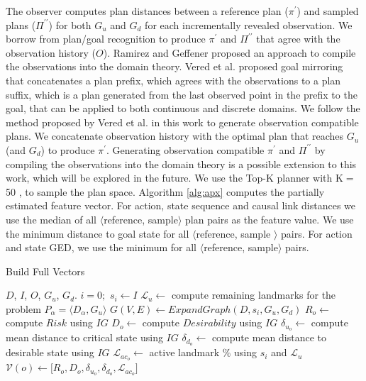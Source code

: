 \documentclass[letterpaper]{article}
\theoremstyle{plain}
\begin{document}
The observer computes plan distances between a reference plan ($\pi^\prime$) and sampled plans ($\Pi^{\prime\prime}$) for both $G_u$ and $G_d$ for each incrementally revealed observation. We borrow from plan/goal recognition to produce $\pi^\prime$ and $\Pi^{\prime\prime}$ that agree with the observation history ($O$). Ramirez and Geffener  proposed an approach to compile the observations into the domain theory. Vered et al.  proposed goal mirroring that concatenates a plan prefix, which agrees with the observations to a plan suffix, which is a plan generated from the last observed point in the prefix to the goal, that can be applied to both continuous and discrete domains. We follow the method proposed by Vered et al.  in this work to generate observation compatible plans. We concatenate observation history with the optimal plan that reaches $G_u$ (and $G_d$) to produce $\pi^\prime$. Generating observation compatible $\pi^\prime$ and $\Pi^{\prime\prime}$ by compiling the observations into the domain theory is a possible extension to this work, which will be explored in the future. We use the Top-K planner with K$=$50 \cite{riabov2014}, to sample the plan space. Algorithm \ref{alg:apx} computes the partially estimated feature vector. For action, state sequence and causal link distances we use the median of all $\langle$reference, sample$\rangle$ plan pairs as the feature value. We use the minimum distance to goal state for all $\langle$reference, sample $\rangle$ pairs. For action and state GED, we use the minimum for all $\langle$reference, sample$\rangle$ pairs.
\vspace{-2mm}
\begin{algorithm}[tb]
        \caption{Build Full Vectors}
        \label{alg:exact}
        \begin{algorithmic}[1]
                \Require $D$, $I$, $O$, $G_u$, $G_d$.
                \State $i=0;$ $ s_i \gets I$
                \State $\mathcal{L}_{u} \gets$ compute remaining landmarks for the problem $P_\alpha=\langle D_\alpha, G_u\rangle$
                        \State $G(V,E) \gets ExpandGraph(D,s_i,G_u,G_d)$
                        \State $R_o \gets$ compute $Risk$ using $IG$
                        \State $D_o \gets$ compute $Desirability$ using $IG$
                        \State $\delta_{u_o} \gets$ compute mean distance to critical state using $IG$
                        \State $\delta_{d_o} \gets$ compute mean distance to desirable state using $IG$
                        \State $\mathcal{L}_{{ac}_o} \gets$ active landmark \% using $s_i$ and  $\mathcal{L}_{u}$
                        \State $\mathcal{V}(o) \gets \lbrack R_o,D_o,\delta_{u_o}, \delta_{d_o}, \mathcal{L}_{{ac}_o}\rbrack$
                \EndFor
                \EndProcedure
        \end{algorithmic}
\end{algorithm}
\end{document}
